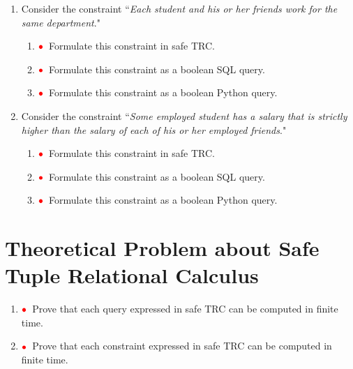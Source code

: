 \documentclass{article}
\newcommand{\red}[1]{{\color{red}#1}}
\newcommand{\redbullet}{$\red{\bullet}$}
\begin{document}
\begin{enumerate}[resume]
\item  Consider the constraint ``\emph{Each student and his or her friends work for the same department}."
\begin{enumerate}
\item \redbullet\ Formulate this constraint in safe TRC.
\item \redbullet\ Formulate this constraint as a boolean SQL query.
\item \redbullet\ Formulate this constraint as a boolean Python query.
\end{enumerate}

\item  Consider the constraint ``\emph{Some employed student has a salary that is strictly higher than the salary of each of his or her employed friends}."
\begin{enumerate}
\item \redbullet\ Formulate this constraint in safe TRC.
\item \redbullet\ Formulate this constraint as a boolean SQL query.
\item \redbullet\ Formulate this constraint as a boolean Python query.
\end{enumerate}

\end{enumerate}
\newpage
\section{Theoretical Problem about Safe Tuple Relational Calculus}

\begin{enumerate}[resume]
\item \redbullet\ Prove that each query expressed in safe TRC can be computed in finite time.
\item \redbullet\ Prove that each constraint expressed in safe TRC can be computed in finite time.
\end{enumerate}
\end{document}
